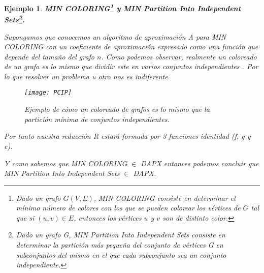 \documentclass[a4paper,12pt,titlepage]{article}
\newtheorem{eje}{Ejemplo}[section]
\begin{document}
\begin{eje}

\textbf{MIN COLORING\footnote{Dado un grafo $G(V,E)$, MIN COLORING consiste en determinar el m\'inimo n\'umero de colores con los que se pueden colorear los v\'ertices de $G$ tal que si $(u,v)\in E$, entonces los v\'ertices $u$ y $v$ son de distinto color.} y MIN Partition Into Independent Sets\footnote{Dado un grafo G, MIN Partition Into Independent Sets consiste en determinar la partici\'on m\'as pequeña del conjunto de v\'ertices G en subconjuntos del mismo en el que cada subconjunto sea un conjunto independiente.}.}

Supongamos que conocemos un algoritmo de aproximaci\'on A para MIN COLORING con un coeficiente de aproximaci\'on expresado como una funci\'on que depende del tamaño del grafo $n$. Como podemos observar, realmente un coloreado de un grafo es lo mismo que dividir este en varios conjuntos independientes \cite{approx_core}. Por lo que resolver un problema u otro nos es indiferente.

\begin{figure}[h]
\centering
\texttt{[image: PCIP]}
\caption{Ejemplo de c\'omo un coloreado de grafos es lo mismo que la partici\'on m\'inima de conjuntos independientes.}
\label{redux:fig:1}
\end{figure}

Por tanto nuestra reducci\'on R estará formada por 3 funciones identidad (f, g y c).

Y como sabemos que MIN COLORING $\in$ DAPX \cite{red1} entonces podemos concluir que MIN Partition Into Independent Sets $\in$ DAPX.

\end{eje}
\end{document}
